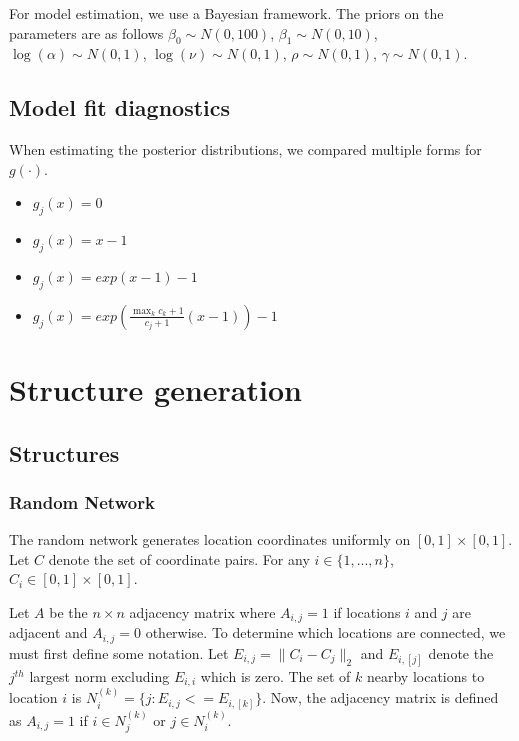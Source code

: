 \documentclass[11pt]{article}
\begin{document}
For model estimation, we use a Bayesian framework.  The priors on the
parameters are as follows $\beta_0 \sim N(0,100)$, $\beta_1 \sim
N(0,10)$, $\log(\alpha) \sim N(0,1)$, $\log(\nu) \sim N(0,1)$, $\rho
\sim N(0,1)$, $\gamma \sim N(0,1)$.


\subsection{Model fit diagnostics}
\label{sec-2-2}

When estimating the posterior distributions, we compared multiple
forms for $g(\cdot)$.
\begin{itemize}
  \item $g_j(x) = 0$
  \item $g_j(x) = x - 1$
  \item $g_j(x) = exp(x - 1) - 1$
  \item $g_j(x) = exp(\frac{\max_k c_k+1}{c_j + 1}(x - 1)) - 1$
\end{itemize}


\section{Structure generation}
\label{sec-3}

\subsection{Structures}
\label{sec-3-1}

\subsubsection{Random Network}
\label{sec-3-1-1}

The random network generates location coordinates uniformly on $[0,1]
\times [0,1]$.  Let $C$ denote the set of coordinate pairs.  For any
$i \in \lbrace 1,...,n \rbrace$, $C_{i} \in [0,1] \times [0,1]$.

Let $A$ be the $n \times n$ adjacency matrix where $A_{i,j} = 1$ if
locations $i$ and $j$ are adjacent and $A_{i,j} = 0$ otherwise.  To
determine which locations are connected, we must first define some
notation.  Let $E_{i,j} = \|C_{i} - C_{j}\|_2$ and $E_{i,[j]}$ denote
the $j^{th}$ largest norm excluding $E_{i,i}$ which is zero.  The set
of $k$ nearby locations to location $i$ is $N^{(k)}_i = \lbrace j :
E_{i,j} <= E_{i,[k]} \rbrace$.  Now, the adjacency matrix is defined
as $A_{i,j} = 1$ if $i \in N_{j}^{(k)}$ or $j \in N_{i}^{(k)}$.
\end{document}
